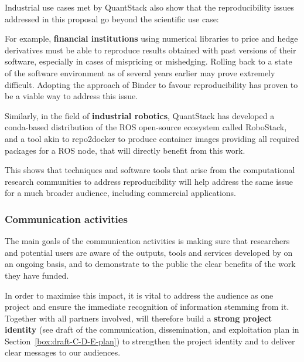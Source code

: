 Industrial use cases met by QuantStack also show that the reproducibility issues addressed in this proposal go
beyond the scientific use case:

\begin{compactitem}
\item For example, \textbf{financial institutions} using numerical libraries to price and hedge derivatives must be able
   to reproduce results obtained with past versions of their software, especially in cases of mispricing or
   mishedging. Rolling back to a state of the software environment as of several years earlier may prove
   extremely difficult. Adopting the approach of Binder to favour reproducibility has proven to be a viable way
   to address this issue.
\item Similarly, in the field of \textbf{industrial robotics}, QuantStack has developed a conda-based distribution of the
   ROS open-source ecosystem called RoboStack, and a tool akin to repo2docker to produce container images providing
   all required packages for a ROS node, that will directly benefit from this work.
\end {compactitem}

This shows that techniques and software tools that arise from the computational
research communities to address reproducibility
will help address the same issue for a much broader audience, including commercial applications.

\subsubsection{Communication activities}

The main goals of the communication activities is making sure that researchers
and potential users are aware of the outputs, tools and services developed by \TheProject
on an ongoing basis, and to demonstrate to the public the clear benefits of the work they have funded.

In order to maximise this impact, it is vital to address the audience as one project
and ensure the immediate recognition of information stemming from it.
Together with all partners involved, \TheProject will therefore build a \textbf{strong project identity}
(see draft of the communication, dissemination, and exploitation plan in Section~\ref{box:draft-C-D-E-plan}) to strengthen the project
identity and to deliver clear messages to our audiences.

